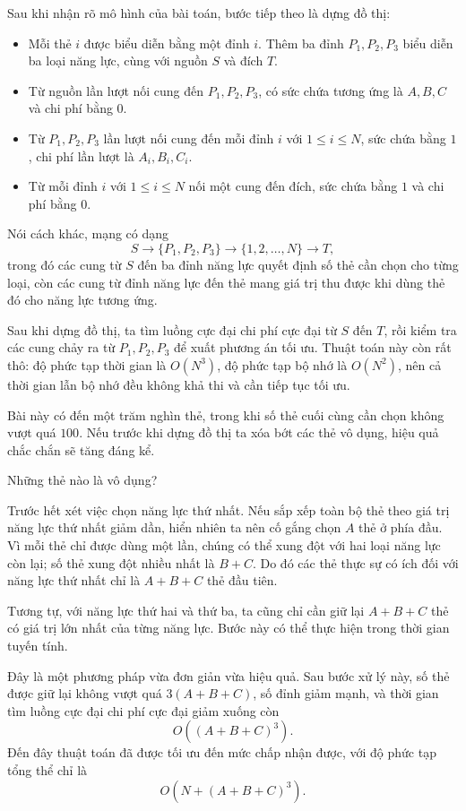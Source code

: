 \documentclass[11pt]{article}
\begin{document}
Sau khi nhận rõ mô hình của bài toán, bước tiếp theo là dựng đồ thị:
\begin{itemize}
  \item Mỗi thẻ $i$ được biểu diễn bằng một đỉnh $i$. Thêm ba đỉnh
  $P_1,P_2,P_3$ biểu diễn ba loại năng lực, cùng với nguồn $S$ và đích $T$.
  \item Từ nguồn lần lượt nối cung đến $P_1,P_2,P_3$, có sức chứa tương ứng
  là $A,B,C$ và chi phí bằng $0$.
  \item Từ $P_1,P_2,P_3$ lần lượt nối cung đến mỗi đỉnh $i$ với $1\le i\le N$,
  sức chứa bằng $1$, chi phí lần lượt là $A_i,B_i,C_i$.
  \item Từ mỗi đỉnh $i$ với $1\le i\le N$ nối một cung đến đích, sức chứa
  bằng $1$ và chi phí bằng $0$.
\end{itemize}

Nói cách khác, mạng có dạng
\[
  S \to \{P_1,P_2,P_3\} \to \{1,2,\ldots,N\} \to T,
\]
trong đó các cung từ $S$ đến ba đỉnh năng lực quyết định số thẻ cần chọn cho
từng loại, còn các cung từ đỉnh năng lực đến thẻ mang giá trị thu được khi
dùng thẻ đó cho năng lực tương ứng.

Sau khi dựng đồ thị, ta tìm luồng cực đại chi phí cực đại từ $S$ đến $T$, rồi
kiểm tra các cung chảy ra từ $P_1,P_2,P_3$ để xuất phương án tối ưu. Thuật
toán này còn rất thô: độ phức tạp thời gian là $O(N^3)$, độ phức tạp bộ nhớ
là $O(N^2)$, nên cả thời gian lẫn bộ nhớ đều không khả thi và cần tiếp tục
tối ưu.

Bài này có đến một trăm nghìn thẻ, trong khi số thẻ cuối cùng cần chọn không
vượt quá $100$. Nếu trước khi dựng đồ thị ta xóa bớt các thẻ vô dụng, hiệu
quả chắc chắn sẽ tăng đáng kể.

Những thẻ nào là vô dụng?

Trước hết xét việc chọn năng lực thứ nhất. Nếu sắp xếp toàn bộ thẻ theo giá
trị năng lực thứ nhất giảm dần, hiển nhiên ta nên cố gắng chọn $A$ thẻ ở phía
đầu. Vì mỗi thẻ chỉ được dùng một lần, chúng có thể xung đột với hai loại
năng lực còn lại; số thẻ xung đột nhiều nhất là $B+C$. Do đó các thẻ thực sự
có ích đối với năng lực thứ nhất chỉ là $A+B+C$ thẻ đầu tiên.

Tương tự, với năng lực thứ hai và thứ ba, ta cũng chỉ cần giữ lại $A+B+C$ thẻ
có giá trị lớn nhất của từng năng lực. Bước này có thể thực hiện trong thời
gian tuyến tính.

Đây là một phương pháp vừa đơn giản vừa hiệu quả. Sau bước xử lý này, số thẻ
được giữ lại không vượt quá $3(A+B+C)$, số đỉnh giảm mạnh, và thời gian tìm
luồng cực đại chi phí cực đại giảm xuống còn
\[
  O((A+B+C)^3).
\]
Đến đây thuật toán đã được tối ưu đến mức chấp nhận được, với độ phức tạp
tổng thể chỉ là
\[
  O(N+(A+B+C)^3).
\]
\end{document}
